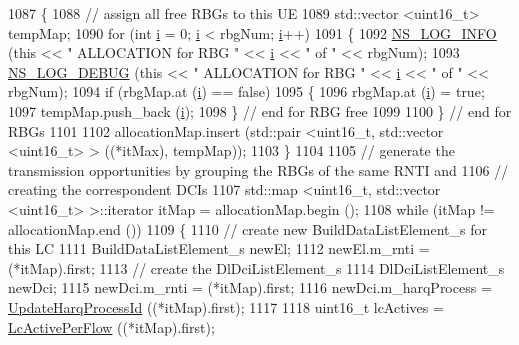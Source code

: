 \begin{DoxyCode}
1087     \{
1088       \textcolor{comment}{// assign all free RBGs to this UE}
1089       std::vector <uint16\_t> tempMap;
1090       \textcolor{keywordflow}{for} (\textcolor{keywordtype}{int} \hyperlink{bernuolliDistribution_8m_a6f6ccfcf58b31cb6412107d9d5281426}{i} = 0; \hyperlink{bernuolliDistribution_8m_a6f6ccfcf58b31cb6412107d9d5281426}{i} < rbgNum; \hyperlink{bernuolliDistribution_8m_a6f6ccfcf58b31cb6412107d9d5281426}{i}++)
1091         \{
1092           \hyperlink{group__logging_gafbd73ee2cf9f26b319f49086d8e860fb}{NS\_LOG\_INFO} (\textcolor{keyword}{this} << \textcolor{stringliteral}{" ALLOCATION for RBG "} << \hyperlink{bernuolliDistribution_8m_a6f6ccfcf58b31cb6412107d9d5281426}{i} << \textcolor{stringliteral}{" of "} << rbgNum);
1093           \hyperlink{group__logging_ga413f1886406d49f59a6a0a89b77b4d0a}{NS\_LOG\_DEBUG} (\textcolor{keyword}{this} << \textcolor{stringliteral}{" ALLOCATION for RBG "} << \hyperlink{bernuolliDistribution_8m_a6f6ccfcf58b31cb6412107d9d5281426}{i} << \textcolor{stringliteral}{" of "} << rbgNum);
1094           \textcolor{keywordflow}{if} (rbgMap.at (\hyperlink{bernuolliDistribution_8m_a6f6ccfcf58b31cb6412107d9d5281426}{i}) == \textcolor{keyword}{false})
1095             \{
1096               rbgMap.at (\hyperlink{bernuolliDistribution_8m_a6f6ccfcf58b31cb6412107d9d5281426}{i}) = \textcolor{keyword}{true};
1097               tempMap.push\_back (\hyperlink{bernuolliDistribution_8m_a6f6ccfcf58b31cb6412107d9d5281426}{i});
1098             \} \textcolor{comment}{// end for RBG free}
1099 
1100         \} \textcolor{comment}{// end for RBGs}
1101 
1102       allocationMap.insert (std::pair <uint16\_t, std::vector <uint16\_t> > ((*itMax), tempMap));
1103     \}
1104 
1105   \textcolor{comment}{// generate the transmission opportunities by grouping the RBGs of the same RNTI and}
1106   \textcolor{comment}{// creating the correspondent DCIs}
1107   std::map <uint16\_t, std::vector <uint16\_t> >::iterator itMap = allocationMap.begin ();
1108   \textcolor{keywordflow}{while} (itMap != allocationMap.end ())
1109     \{
1110       \textcolor{comment}{// create new BuildDataListElement\_s for this LC}
1111       BuildDataListElement\_s newEl;
1112       newEl.m\_rnti = (*itMap).first;
1113       \textcolor{comment}{// create the DlDciListElement\_s}
1114       DlDciListElement\_s newDci;
1115       newDci.m\_rnti = (*itMap).first;
1116       newDci.m\_harqProcess = \hyperlink{classns3_1_1TdMtFfMacScheduler_ac0e32e62bc8fc2a69f4f65ae8a2d57cd}{UpdateHarqProcessId} ((*itMap).first);
1117 
1118       uint16\_t lcActives = \hyperlink{classns3_1_1TdMtFfMacScheduler_a50717a0cb48dabadc5c373b9eb1cc8ba}{LcActivePerFlow} ((*itMap).first);

\end{DoxyCode}
